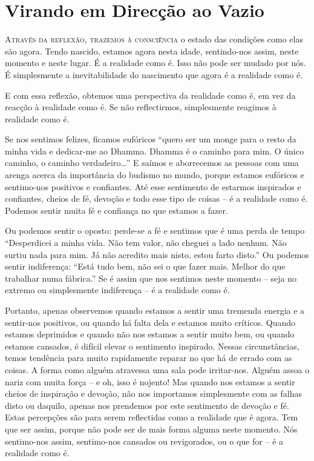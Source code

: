 \chapter{Virando em Direcção ao Vazio}

\lettrine{A}{través da reflexão, trazemos à consciência} o estado das condições como elas são
agora. Tendo nascido, estamos agora nesta idade, sentindo-nos assim, neste
momento e neste lugar. É a realidade como é. Isso não pode ser mudado por nós. É
simplesmente a inevitabilidade do nascimento que agora é a realidade como é.

E com essa reflexão, obtemos uma perspectiva da realidade como é, em vez da
reacção à realidade como é. Se não reflectirmos, simplesmente reagimos à
realidade como é.

Se nos sentimos felizes, ficamos eufóricos ``quero ser um monge para o resto da
minha vida e dedicar-me ao Dhamma. Dhamma é o caminho para mim. O único caminho,
o caminho verdadeiro\ldots{}'' E saímos e aborrecemos as pessoas com uma arenga
acerca da importância do budismo no mundo, porque estamos eufóricos e
sentimo-nos positivos e confiantes. Até esse sentimento de estarmos inspirados e
confiantes, cheios de fé, devoção e todo esse tipo de coisas -- é a realidade
como é. Podemos sentir muita fé e confiança no que estamos a fazer.

Ou podemos sentir o oposto: perde-se a fé e sentimos que é uma perda de tempo
``Desperdicei a minha vida. Não tem valor, não cheguei a lado nenhum. Não surtiu
nada para mim. Já não acredito mais nisto, estou farto disto.'' Ou podemos
sentir indiferença: ``Está tudo bem, não sei o que fazer mais. Melhor do que
trabalhar numa fábrica.'' Se é assim que nos sentimos neste momento -- seja no
extremo ou simplesmente indiferença -- é a realidade como é.

Portanto, apenas observemos quando estamos a sentir uma tremenda energia e a
sentir-nos positivos, ou quando há falta dela e estamos muito críticos. Quando
estamos deprimidos e quando não nos estamos a sentir muito bem, ou quando
estamos cansados, é difícil elevar o sentimento inspirado. Nessas
circunstâncias, temos tendência para muito rapidamente reparar no que há de
errado com as coisas. A forma como alguém atravessa uma sala pode irritar-nos.
Alguém assoa o nariz com muita força -- e oh, isso é nojento! Mas quando nos
estamos a sentir cheios de inspiração e devoção, não nos importamos simplesmente
com as falhas disto ou daquilo, apenas nos prendemos por este sentimento de
devoção e fé. Estas percepções são para serem reflectidas como a realidade que é
agora. Tem que ser assim, porque não pode ser de mais forma alguma neste
momento. Nós sentimo-nos assim, sentimo-nos cansados ou revigorados, ou o que
for -- é a realidade como é.

